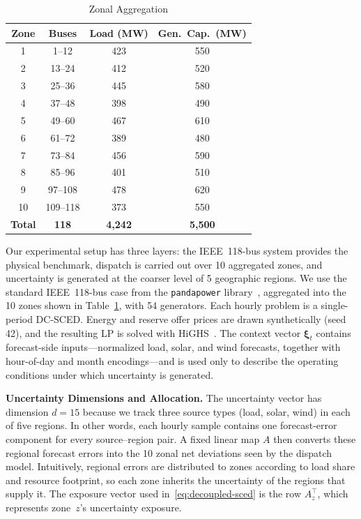 \documentclass[11pt]{article}
\newcommand{\bxi}{\bm{\xi}}
\theoremstyle{definition}
\begin{document}
\begin{table}[!t]
\caption{Zonal Aggregation}
\label{tab:zones}
\centering
\begin{tabular}{cccc}
\toprule
\textbf{Zone} & \textbf{Buses} & \textbf{Load (MW)} & \textbf{Gen.\ Cap.\ (MW)} \\
\midrule
1 & 1--12 & 423 & 550 \\
2 & 13--24 & 412 & 520 \\
3 & 25--36 & 445 & 580 \\
4 & 37--48 & 398 & 490 \\
5 & 49--60 & 467 & 610 \\
6 & 61--72 & 389 & 480 \\
7 & 73--84 & 456 & 590 \\
8 & 85--96 & 401 & 510 \\
9 & 97--108 & 478 & 620 \\
10 & 109--118 & 373 & 550 \\
\midrule
\textbf{Total} & \textbf{118} & \textbf{4,242} & \textbf{5,500} \\
\bottomrule
\end{tabular}
\end{table}

Our experimental setup has three layers: the IEEE~118-bus system provides the physical benchmark, dispatch is carried out over 10 aggregated zones, and uncertainty is generated at the coarser level of 5 geographic regions. We use the standard IEEE~118-bus case from the \texttt{pandapower} library~\citep{thurner2018pandapower}, aggregated into the 10 zones shown in Table~\ref{tab:zones}, with 54 generators. Each hourly problem is a single-period DC-SCED. Energy and reserve offer prices are drawn synthetically (seed 42), and the resulting LP is solved with HiGHS~\citep{huangfu2018parallelizing}. The context vector $\bxi_t$ contains forecast-side inputs---normalized load, solar, and wind forecasts, together with hour-of-day and month encodings---and is used only to describe the operating conditions under which uncertainty is generated.

\textbf{Uncertainty Dimensions and Allocation.} The uncertainty vector has dimension $d=15$ because we track three source types (load, solar, wind) in each of five regions. In other words, each hourly sample contains one forecast-error component for every source--region pair. A fixed linear map $A$ then converts these regional forecast errors into the 10 zonal net deviations seen by the dispatch model. Intuitively, regional errors are distributed to zones according to load share and resource footprint, so each zone inherits the uncertainty of the regions that supply it. The exposure vector used in~\eqref{eq:decoupled-sced} is the row $A_z^\top$, which represents zone~$z$'s uncertainty exposure.
\end{document}
